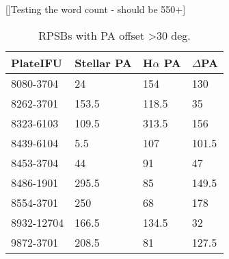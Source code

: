 []Testing the word count - should be 550+]

\begin{table}
\caption{RPSBs with PA offset \textgreater 30 deg.}
\label{tab:offsetRPSBs}
\begin{tabular}{llll}
\hline
PlateIFU   & Stellar PA & H$\alpha$ PA & $\Delta$PA \\
\hline
8080-3704 & 24 & 154 & 130 \\
8262-3701 & 153.5 & 118.5 & 35 \\
8323-6103 & 109.5 & 313.5 & 156 \\
8439-6104 & 5.5 & 107 & 101.5 \\
8453-3704 & 44 & 91 & 47 \\
8486-1901 & 295.5 & 85 & 149.5 \\
8554-3701 & 250 & 68 & 178 \\
8932-12704 & 166.5 & 134.5 & 32 \\
9872-3701 & 208.5 & 81 & 127.5 \\
\hline
\end{tabular}
\end{table}